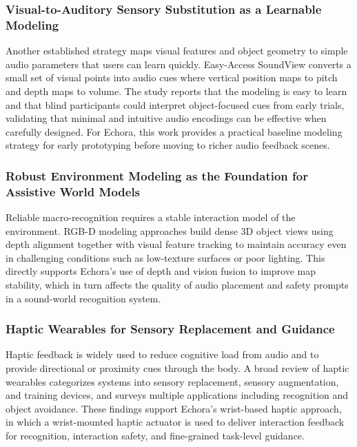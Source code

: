 \subsubsection{Visual-to-Auditory Sensory Substitution as a Learnable Modeling}
\label{subsec:lit_visual_to_audio}

Another established strategy maps visual features and object geometry to simple audio parameters that users can learn quickly. Easy-Access SoundView converts a small set of visual points into audio cues where vertical position maps to pitch and depth maps to volume. The study reports that the modeling is easy to learn and that blind participants could interpret object-focused cues from early trials, validating that minimal and intuitive audio encodings can be effective when carefully designed. For Echora, this work provides a practical baseline modeling strategy for early prototyping before moving to richer audio feedback scenes.

\subsubsection{Robust Environment Modeling as the Foundation for Assistive World Models}
\label{subsec:lit_world_models}

Reliable macro-recognition requires a stable interaction model of the environment. RGB-D modeling approaches build dense 3D object views using depth alignment together with visual feature tracking to maintain accuracy even in challenging conditions such as low-texture surfaces or poor lighting. This directly supports Echora’s use of depth and vision fusion to improve map stability, which in turn affects the quality of audio placement and safety prompts in a sound-world recognition system.

\subsubsection{Haptic Wearables for Sensory Replacement and Guidance}
\label{subsec:lit_haptics}

Haptic feedback is widely used to reduce cognitive load from audio and to provide directional or proximity cues through the body. A broad review of haptic wearables categorizes systems into sensory replacement, sensory augmentation, and training devices, and surveys multiple applications including recognition and object avoidance. These findings support Echora’s wrist-based haptic approach, in which a wrist-mounted haptic actuator is used to deliver interaction feedback for recognition, interaction safety, and fine-grained task-level guidance.

